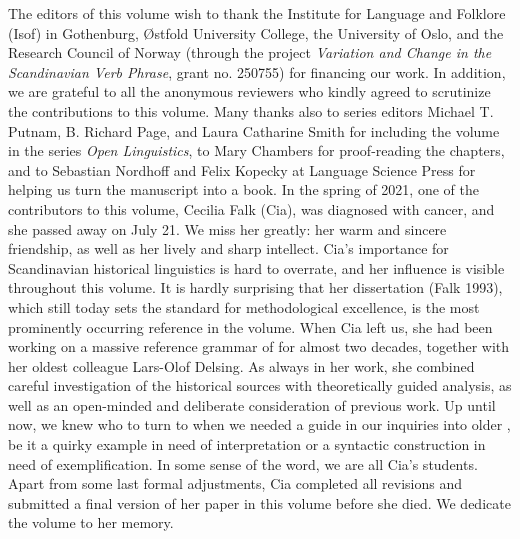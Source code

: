 The editors of this volume wish to thank the Institute for Language and Folklore (Isof) in Gothenburg, Østfold University College, the University of Oslo, and the Research Council of Norway (through the project \textit{Variation and Change in the Scandinavian Verb Phrase}, grant no. 250755) for financing our work. In addition, we are grateful to all the anonymous reviewers who kindly agreed to scrutinize the contributions to this volume. Many thanks also to series editors Michael T. Putnam, B. Richard Page, and Laura Catharine Smith for including the volume in the series \textit{Open  Linguistics}, to Mary Chambers for proof-reading the chapters, and to Sebastian Nordhoff and Felix Kopecky at Language Science Press for helping us turn the manuscript into a book.
In the spring of 2021, one of the contributors to this volume, Cecilia Falk (Cia), was diagnosed with cancer, and she passed away on July 21. We miss her greatly: her warm and sincere friendship, as well as her lively and sharp intellect. Cia’s importance for Scandinavian historical linguistics is hard to overrate, and her influence is visible throughout this volume. It is hardly surprising that her dissertation (Falk 1993), which still today sets the standard for methodological excellence, is the most prominently occurring reference in the volume. When Cia left us, she had been working on a massive reference grammar of  for almost two decades, together with her oldest colleague Lars-Olof Delsing. As always in her work, she combined careful investigation of the historical sources with theoretically guided analysis, as well as an open-minded and deliberate consideration of previous work. Up until now, we knew who to turn to when we needed a guide in our inquiries into older , be it a quirky example in need of interpretation or a syntactic construction in need of exemplification. In some sense of the word, we are all Cia’s students.
Apart from some last formal adjustments, Cia completed all revisions and submitted a final version of her paper in this volume before she died. We dedicate the volume to her memory.